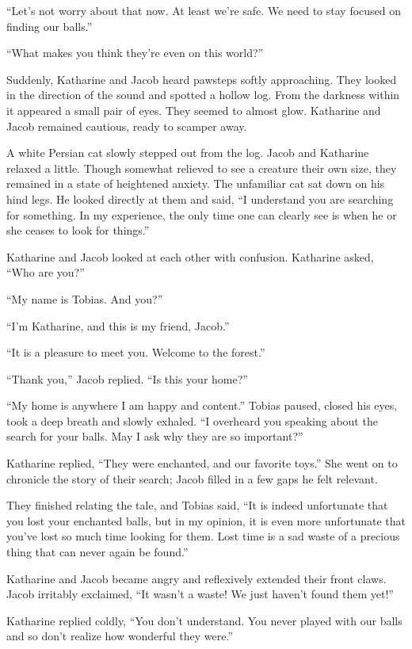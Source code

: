 “Let's not worry about that now. At least we're safe. We need to stay focused on finding our balls.”

“What makes you think they're even on this world?”

Suddenly, Katharine and Jacob heard pawsteps softly approaching. They looked in the direction of the sound and spotted a hollow log. From the darkness within it appeared a small pair of eyes. They seemed to almost glow. Katharine and Jacob remained cautious, ready to scamper away.

A white Persian cat slowly stepped out from the log. Jacob and Katharine relaxed a little. Though somewhat relieved to see a creature their own size, they remained in a state of heightened anxiety. The unfamiliar cat sat down on his hind legs. He looked directly at them and said, “I understand you are searching for something. In my experience, the only time one can clearly see is when he or she ceases to look for things.”

Katharine and Jacob looked at each other with confusion. Katharine asked, “Who are you?”

“My name is Tobias. And you?”

“I'm Katharine, and this is my friend, Jacob.”

“It is a pleasure to meet you. Welcome to the forest.”

“Thank you,” Jacob replied. “Is this your home?”

“My home is anywhere I am happy and content.” Tobias paused, closed his eyes, took a deep breath and slowly exhaled. “I overheard you speaking about the search for your balls. May I ask why they are so important?”

Katharine replied, “They were enchanted, and our favorite toys.” She went on to chronicle the story of their search; Jacob filled in a few gaps he felt relevant.

They finished relating the tale, and Tobias said, “It is indeed unfortunate that you lost your enchanted balls, but in my opinion, it is even more unfortunate that you've lost so much time looking for them. Lost time is a sad waste of a precious thing that can never again be found.”

Katharine and Jacob became angry and reflexively extended their front claws. Jacob irritably exclaimed, “It wasn't a waste! We just haven't found them yet!”

Katharine replied coldly, “You don't understand. You never played with our balls and so don't realize how wonderful they were.”

